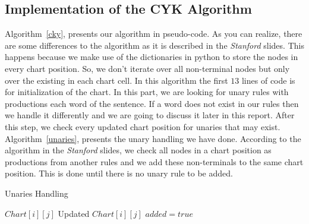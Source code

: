 \documentclass[a4paper,11pt]{article}
\begin{document}
\subsection{Implementation of the CYK Algorithm}
Algorithm~\ref{cky}, presents our algorithm in pseudo-code. As you can realize, there are some differences to the algorithm as it is described in the \textit{Stanford} slides. This happens because we make use of the dictionaries in python to store the nodes in every chart position. So, we don't iterate over all non-terminal nodes but only over the existing in each chart cell. In this algorithm the first $13$ lines of code is for initialization of the chart. In this part, we are looking for unary rules with productions each word of the sentence. If a word does not exist in our rules then we handle it differently and we are going to discuss it later in this report. After this step, we check every updated chart position for unaries that may exist. Algorithm~\ref{unaries}, presents the unary handling we have done. According to the algorithm in the \textit{Stanford} slides, we check all nodes in a chart position as productions from another rules and we add these non-terminals to the same chart position. This is done until there is no unary rule to be added.

\begin{algorithm}[t!]
\caption{Unaries Handling}
\label{unaries}
\begin{small}
\begin{algorithmic}[1]
$Chart[i][j]$
Updated $Chart[i][j]$
\STATE $added = true$
\ENDFOR
\ENDFOR
\ENDWHILE
\end{algorithmic}
\end{small}
\end{algorithm}
\end{document}
